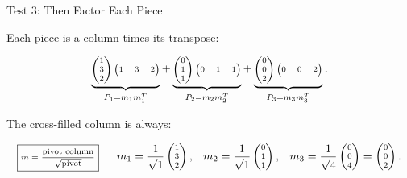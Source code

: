 \documentclass[10pt]{beamer}
\theoremstyle{definition}
\begin{document}
\begin{frame}[shrink=8]{Test 3: Then Factor Each Piece}

Each piece is a column times its transpose:

\[
\scriptsize
\underbrace{
\begin{pmatrix}1\\3\\2\end{pmatrix}
\begin{pmatrix}1&3&2\end{pmatrix}}_{P_1=m_1m_1^T}
+
\underbrace{
\begin{pmatrix}0\\1\\1\end{pmatrix}
\begin{pmatrix}0&1&1\end{pmatrix}}_{P_2=m_2m_2^T}
+
\underbrace{
\begin{pmatrix}0\\0\\2\end{pmatrix}
\begin{pmatrix}0&0&2\end{pmatrix}}_{P_3=m_3m_3^T}.
\]

\vfill

The cross-filled column is always:

\[
\scriptsize
\boxed{
m=\frac{\text{pivot column}}{\sqrt{\text{pivot}}}
}
\qquad
m_1=\frac1{\sqrt1}\begin{pmatrix}1\\3\\2\end{pmatrix},
\quad
m_2=\frac1{\sqrt1}\begin{pmatrix}0\\1\\1\end{pmatrix},
\quad
m_3=\frac1{\sqrt4}\begin{pmatrix}0\\0\\4\end{pmatrix}
=\begin{pmatrix}0\\0\\2\end{pmatrix}.
\]

\end{frame}
\end{document}
